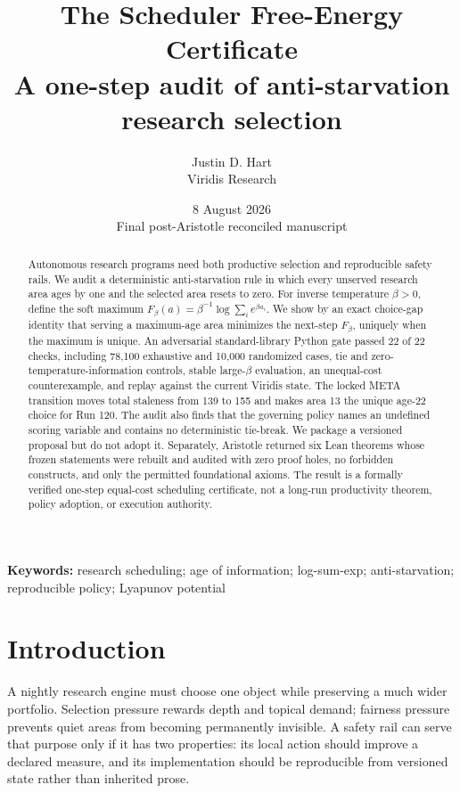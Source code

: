 \documentclass[10pt]{article}
\title{\vspace{-1.2em}\textbf{The Scheduler Free-Energy Certificate}\\
\large A one-step audit of anti-starvation research selection}
\author{Justin D. Hart\\\small Viridis Research}
\date{8 August 2026\\\small Final post-Aristotle reconciled manuscript}
\begin{document}
\maketitle

\begin{abstract}
Autonomous research programs need both productive selection and reproducible
safety rails.  We audit a deterministic anti-starvation rule in which every
unserved research area ages by one and the selected area resets to zero.  For
inverse temperature $\beta>0$, define the soft maximum
$F_\beta(a)=\beta^{-1}\log\sum_i e^{\beta a_i}$.  We show by an exact
choice-gap identity that serving a maximum-age area minimizes the next-step
$F_\beta$, uniquely when the maximum is unique.  An adversarial standard-library
Python gate passed 22 of 22 checks, including 78,100 exhaustive and 10,000
randomized cases, tie and zero-temperature-information controls, stable
large-$\beta$ evaluation, an unequal-cost counterexample, and replay against the
current Viridis state.  The locked META transition moves total staleness from
139 to 155 and makes area 13 the unique age-22 choice for Run 120.  The audit
also finds that the governing policy names an undefined scoring variable and
contains no deterministic tie-break.  We package a versioned proposal but do
not adopt it.  Separately, Aristotle returned six Lean theorems whose frozen
statements were rebuilt and audited with zero proof holes, no forbidden
constructs, and only the permitted foundational axioms.  The result is a
formally verified one-step equal-cost scheduling certificate, not a long-run
productivity theorem, policy adoption, or execution authority.
\end{abstract}

\textbf{Keywords:} research scheduling; age of information; log-sum-exp;
anti-starvation; reproducible policy; Lyapunov potential

\section{Introduction}

A nightly research engine must choose one object while preserving a much wider
portfolio.  Selection pressure rewards depth and topical demand; fairness
pressure prevents quiet areas from becoming permanently invisible.  A safety
rail can serve that purpose only if it has two properties: its local action
should improve a declared measure, and its implementation should be reproducible
from versioned state rather than inherited prose.
\end{document}
